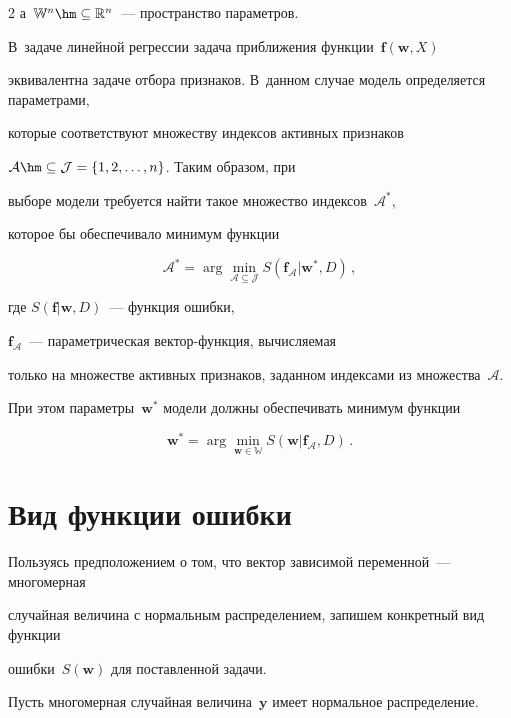 \begin{multicols}{2}
 а~$\mathbb{W}^n \hm\subseteq \mathbb{R}^n$~--- пространство параметров. 

 В~задаче линейной регрессии задача приближения функции~$\mathbf{f}(\mathbf{w}, X)$ 

 эквивалентна задаче отбора приз\-наков. В~данном случае модель определяется \mbox{параметрами}, 

 которые соответствуют множеству индексов активных признаков 

 $\mathcal{A}\hm\subseteq \mathcal{J} = \{1,2,\ldots ,n\}$. Таким образом, при 

 выборе модели требуется найти такое множество индексов~$\mathcal{A}^{*}$, 

 которое бы обеспечивало минимум функции

 $$

 \mathcal{A}^{*}=\arg \min\limits_{\mathcal{A} 

 \subseteq \mathcal{J}} S(\mathbf{f}_{\mathcal{A}}|\mathbf{w}^{*},D)\,,

 $$

 где $S(\mathbf{f}|\mathbf{w},D)$~--- функция ошибки, 

 $\mathbf{f}_{\mathcal{A}}$~--- па\-ра\-мет\-ри\-че\-ская век\-тор-функ\-ция, вычисляемая 

 только на множестве активных признаков, заданном индексами из множества~$\mathcal{A}$.

 При этом параметры~$\mathbf{w}^{*}$ модели должны обеспечивать минимум функции

 $$

 \mathbf{w}^{*}=\arg \min \limits_{\mathbf{w}\in\mathbb{W}} 

 S(\mathbf{w}|\mathbf{f}_{\mathcal{A}},D)\,.

 $$



\section{Вид функции ошибки}



Пользуясь предположением о том, что вектор зависимой переменной~--- многомерная 

случайная величина с нормальным распределением, запишем конкретный вид функции 

ошибки~$S(\mathbf{w})$ для по\-став\-лен\-ной задачи.



Пусть многомерная случайная величина~$\mathbf{y}$ имеет нормальное распределение. 


\end{multicols}
